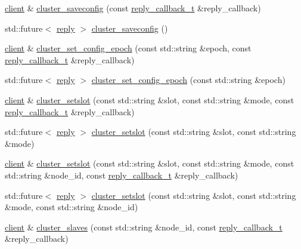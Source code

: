 \begin{DoxyCompactItemize}
\hyperlink{classcpp__redis_1_1client}{client} \& \hyperlink{classcpp__redis_1_1client_a2860dbeb1f7acd44e72e3ad02fc16e20}{cluster\+\_\+saveconfig} (const \hyperlink{classcpp__redis_1_1client_a061a1140d36d2eaeda82b09a0bb3f9f2}{reply\+\_\+callback\+\_\+t} \&reply\+\_\+callback)
\item 
std\+::future$<$ \hyperlink{classcpp__redis_1_1reply}{reply} $>$ \hyperlink{classcpp__redis_1_1client_a5b8571b48e9e56fad203a04dd50559be}{cluster\+\_\+saveconfig} ()
\item 
\hyperlink{classcpp__redis_1_1client}{client} \& \hyperlink{classcpp__redis_1_1client_ac930f6544459b0b2476f741beb6a2508}{cluster\+\_\+set\+\_\+config\+\_\+epoch} (const std\+::string \&epoch, const \hyperlink{classcpp__redis_1_1client_a061a1140d36d2eaeda82b09a0bb3f9f2}{reply\+\_\+callback\+\_\+t} \&reply\+\_\+callback)
\item 
std\+::future$<$ \hyperlink{classcpp__redis_1_1reply}{reply} $>$ \hyperlink{classcpp__redis_1_1client_a0be11e04ce58a13e2e40272be1fad788}{cluster\+\_\+set\+\_\+config\+\_\+epoch} (const std\+::string \&epoch)
\item 
\hyperlink{classcpp__redis_1_1client}{client} \& \hyperlink{classcpp__redis_1_1client_aeba14289869fe871eb9eb9c2503635a8}{cluster\+\_\+setslot} (const std\+::string \&slot, const std\+::string \&mode, const \hyperlink{classcpp__redis_1_1client_a061a1140d36d2eaeda82b09a0bb3f9f2}{reply\+\_\+callback\+\_\+t} \&reply\+\_\+callback)
\item 
std\+::future$<$ \hyperlink{classcpp__redis_1_1reply}{reply} $>$ \hyperlink{classcpp__redis_1_1client_ad9b75e2c90b1b87fa93a3ac76bd1512f}{cluster\+\_\+setslot} (const std\+::string \&slot, const std\+::string \&mode)
\item 
\hyperlink{classcpp__redis_1_1client}{client} \& \hyperlink{classcpp__redis_1_1client_a4e87a3163d16db267136a127e5c843e2}{cluster\+\_\+setslot} (const std\+::string \&slot, const std\+::string \&mode, const std\+::string \&node\+\_\+id, const \hyperlink{classcpp__redis_1_1client_a061a1140d36d2eaeda82b09a0bb3f9f2}{reply\+\_\+callback\+\_\+t} \&reply\+\_\+callback)
\item 
std\+::future$<$ \hyperlink{classcpp__redis_1_1reply}{reply} $>$ \hyperlink{classcpp__redis_1_1client_a824c1234198e48badeccf4190b610e32}{cluster\+\_\+setslot} (const std\+::string \&slot, const std\+::string \&mode, const std\+::string \&node\+\_\+id)
\item 
\hyperlink{classcpp__redis_1_1client}{client} \& \hyperlink{classcpp__redis_1_1client_ac03fb62a9eb5abbb5248bc38fd4dfb5e}{cluster\+\_\+slaves} (const std\+::string \&node\+\_\+id, const \hyperlink{classcpp__redis_1_1client_a061a1140d36d2eaeda82b09a0bb3f9f2}{reply\+\_\+callback\+\_\+t} \&reply\+\_\+callback)

\end{DoxyCompactItemize}
